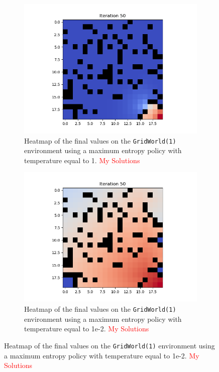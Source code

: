 \documentclass{article}
\begin{document}
\begin{enumerate}[(a)]
\begin{figure}[h!]
    \centering
    \begin{subfigure}{0.3\textwidth}
        \centering
        \includegraphics[width=\textwidth]{figures/part_1_b_t1_grid1.png}
        \caption{Heatmap of the final values on the \texttt{GridWorld(1)} environment using a maximum entropy policy with temperature equal to 1.  \textcolor{red}{My Solutions}}
    \end{subfigure}
    \hspace{0.1 in}
    \begin{subfigure}{0.3\textwidth}
        \centering
        \includegraphics[width=\textwidth]{figures/part_1_b_t1e-2_grid1.png}
        \caption{Heatmap of the final values on the \texttt{GridWorld(1)} environment using a maximum entropy policy with temperature equal to 1e-2.  \textcolor{red}{My Solutions}}

\end{subfigure}
\end{figure}
\end{enumerate}
\end{document}
